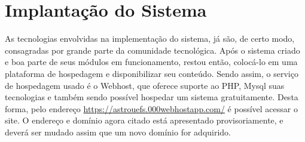\section{Implantação do Sistema}

As tecnologias envolvidas na implementação do sistema, já são, de certo modo, consagradas por grande parte da comunidade tecnológica. Após o sistema criado e boa parte de seus módulos em funcionamento, restou então, colocá-lo em uma plataforma de hospedagem e disponibilizar seu conteúdo. Sendo assim, o serviço de hospedagem usado é o Webhost, que oferece suporte ao PHP, Mysql suas tecnologias e também sendo possível hospedar um sistema gratuitamente. Desta forma, pelo endereço \url{https://astrouefs.000webhostapp.com/} é possível acessar o site. O endereço e domínio agora citado está apresentado provisoriamente, e deverá ser mudado assim que um novo domínio for adquirido.


